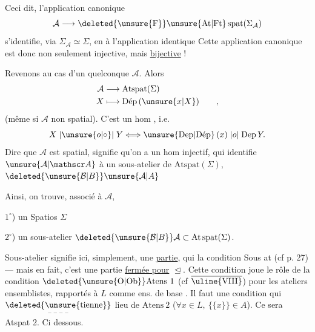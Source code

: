 Ceci dit, l'application canonique
\[
\mathcal A\longrightarrow\deleted{\unsure{\mathrm F}}\unsure{\mathrm{At}|\mathrm{Ft}}\,\mathrm{spat}(\Sigma_{\mathcal A})
\]
s'identifie, via $\Sigma_{\mathcal A}\simeq\Sigma$, en 
à l'application identique Cette application canonique est donc non seulement injective, mais \uline{bijective} !

Revenons au cas d'un   quelconque $\mathcal A$.  Alors 
\[
\begin{aligned}
\mathcal A&\longrightarrow\mathrm{Atspat}(\Sigma)\\
X&\longmapsto\text{Dép}\,(\unsure{x|X})\qquad ,
\end{aligned}
\]
(même si  $\mathcal A$ non spatial). C'est un hom \uline{}, i.e.
\[
X\mathrel{|\unsure{o|\circ}|}Y\Longleftrightarrow\text{\unsure{Dep|Dép}}\,(x)\mathrel{|o|}\text{Dep}\,Y.
\]
Dire que $\mathcal A$ est spatial, signifie
qu'on a un hom injectif, qui identifie $\unsure{\mathcal A|\mathscr A}$ à un sous-atelier de $\mathrm{Atspat}(\Sigma)$,   $\deleted{\unsure{\mathcal B|B}}\unsure{\mathcal A|A}$

Ainsi, on trouve, associé à $\mathcal A$, 

$1^{\circ}$) un Spatios $\Sigma$

$2^{\circ}$) un sous-atelier $\deleted{\unsure{\mathcal B|B}}\mathcal A\subset\mathrm{At}\,\mathrm{spat}(\Sigma)$. 

Sous-atelier signifie ici, simplement, une \uline{partie}, qui  la condition Sous at (cf p. 27) --- mais en fait, c'est  une partie \uline{fermée pour} $\trianglelefteq$.
Cette condition joue le rôle de la condition $\deleted{\unsure{\mathrm O|\mathrm{Ob}}}\mathrm{Atens}\ 1$ (cf  $\overline{\text{\uline{VIII}}}$) pour les ateliers ensemblistes, rapportés à $L$ comme ens. de base . Il faut une condition qui $\underset{\text{-- -- -- --}}{\text{\deleted{\unsure{tienne}}}}$ lieu de $\mathrm{Atens}\ 2$ ($\forall x\in L,\ \{\{x\}\}\in A$). Ce sera Atspat 2. Ci dessous.

